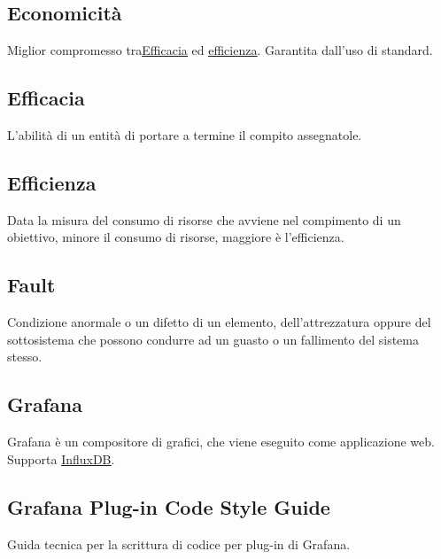 	\subsection{Economicità}
	\label{sec:economicita}
	Miglior compromesso tra\underline{\hyperref[sec:efficacia]{Efficacia}} ed \underline{\hyperref[sec:efficienza]{efficienza}}. Garantita dall'uso di standard.

	\subsection{Efficacia}
	\label{sec:efficacia}
	L'abilità di un entità di portare a termine il compito assegnatole.


	\subsection{Efficienza}
	\label{sec:efficienza}
	Data la misura del consumo di risorse che avviene nel compimento di un obiettivo, minore il consumo di risorse, maggiore è l'efficienza.
	\newpage
	\subsection{Fault}
	\label{sec:fault}	
	Condizione anormale o un difetto di un elemento, dell'attrezzatura oppure del sottosistema che possono condurre ad un guasto o un fallimento del sistema stesso.
	
	\newpage

	\subsection{Grafana}
	\label{sec:grafana}
	Grafana è un compositore di grafici, che viene eseguito come applicazione web. Supporta \underline{\hyperref[sec:influxdb]{InfluxDB}}.


	\subsection{Grafana Plug-in Code Style Guide}
	\label{sec:grafana}
	Guida tecnica per la scrittura di codice per plug-in di Grafana.


	\newpage


